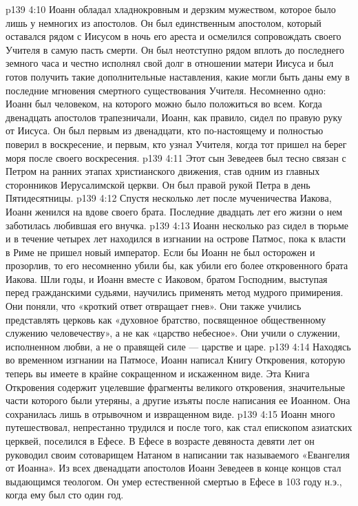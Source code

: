 \vs p139 4:10 Иоанн обладал хладнокровным и дерзким мужеством, которое было лишь у немногих из апостолов. Он был единственным апостолом, который оставался рядом с Иисусом в ночь его ареста и осмелился сопровождать своего Учителя в самую пасть смерти. Он был неотступно рядом вплоть до последнего земного часа и честно исполнял свой долг в отношении матери Иисуса и был готов получить такие дополнительные наставления, какие могли быть даны ему в последние мгновения смертного существования Учителя. Несомненно одно: Иоанн был человеком, на которого можно было положиться во всем. Когда двенадцать апостолов трапезничали, Иоанн, как правило, сидел по правую руку от Иисуса. Он был первым из двенадцати, кто по\hyp{}настоящему и полностью поверил в воскресение, и первым, кто узнал Учителя, когда тот пришел на берег моря после своего воскресения.
\vs p139 4:11 Этот сын Зеведеев был тесно связан с Петром на ранних этапах христианского движения, став одним из главных сторонников Иерусалимской церкви. Он был правой рукой Петра в день Пятидесятницы.
\vs p139 4:12 Спустя несколько лет после мученичества Иакова, Иоанн женился на вдове своего брата. Последние двадцать лет его жизни о нем заботилась любившая его внучка.
\vs p139 4:13 Иоанн несколько раз сидел в тюрьме и в течение четырех лет находился в изгнании на острове Патмос, пока к власти в Риме не пришел новый император. Если бы Иоанн не был осторожен и прозорлив, то его несомненно убили бы, как убили его более откровенного брата Иакова. Шли годы, и Иоанн вместе с Иаковом, братом Господним, выступая перед гражданскими судьями, научились применять метод мудрого примирения. Они поняли, что «кроткий ответ отвращает гнев». Они также учились представлять церковь как «духовное братство, посвященное общественному служению человечеству», а не как «царство небесное». Они учили о служении, исполненном любви, а не о правящей силе --- царстве и царе.
\vs p139 4:14 Находясь во временном изгнании на Патмосе, Иоанн написал Книгу Откровения, которую теперь вы имеете в крайне сокращенном и искаженном виде. Эта Книга Откровения содержит уцелевшие фрагменты великого откровения, значительные части которого были утеряны, а другие изъяты после написания ее Иоанном. Она сохранилась лишь в отрывочном и извращенном виде.
\vs p139 4:15 Иоанн много путешествовал, непрестанно трудился и после того, как стал епископом азиатских церквей, поселился в Ефесе. В Ефесе в возрасте девяноста девяти лет он руководил своим сотоварищем Натаном в написании так называемого «Евангелия от Иоанна». Из всех двенадцати апостолов Иоанн Зеведеев в конце концов стал выдающимся теологом. Он умер естественной смертью в Ефесе в 103 году н.э., когда ему был сто один год.
